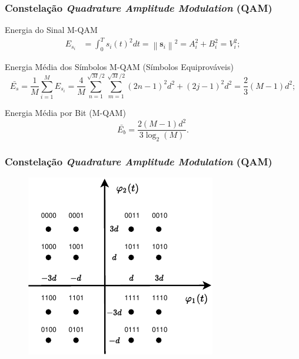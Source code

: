 \documentclass{beamer}
\newcommand{\pag}[1] {\begin{frame}#1\end{frame}}
\newcommand{\norm}[1]{\left\lVert#1\right\rVert}
\begin{document}
\pag{
	\frametitle{Constelação \textit{Quadrature Amplitude Modulation} (QAM)}
	\begin{block}{Energia do Sinal M-QAM}
		\begin{equation}
			\begin{aligned}
				E_{s_{i}} &= \int_{0}^{T} s_{i}(t)^{2}dt = \norm{\mathbf{s}_{i}}^2 = A_{i}^2 + B_{i}^2 = V_{i}^2;
			\end{aligned}
		\end{equation}
	\end{block}
	\begin{block}{Energia Média dos Símbolos M-QAM (Símbolos Equiprováveis)}
		\begin{equation}
			\bar{E_{s}} = \frac{1}{M}\sum_{i = 1}^{M}E_{s_{i}} = \frac{4}{M}\sum_{n = 1}^{\sqrt{M}/2}\sum_{m = 1}^{\sqrt{M}/2}(2n - 1 )^2 d^2 + (2j-1)^2d^2 = \frac{2}{3}(M - 1)d^2;
		\end{equation}
	\end{block}
		\begin{block}{Energia Média por Bit (M-QAM)}
		\begin{equation}
			\bar{E_{b}} = \frac{2(M - 1)d^2}{3\log_{2}(M)}.
		\end{equation}
		\end{block}
}

\pag{
	\frametitle{Constelação \textit{Quadrature Amplitude Modulation} (QAM)}
			\begin{figure}[!h]
				\centering
			  \includegraphics[width = 0.65\linewidth]{QAM_C1.pdf}
				\label{QAMMod}
			\end{figure}
}
\end{document}
